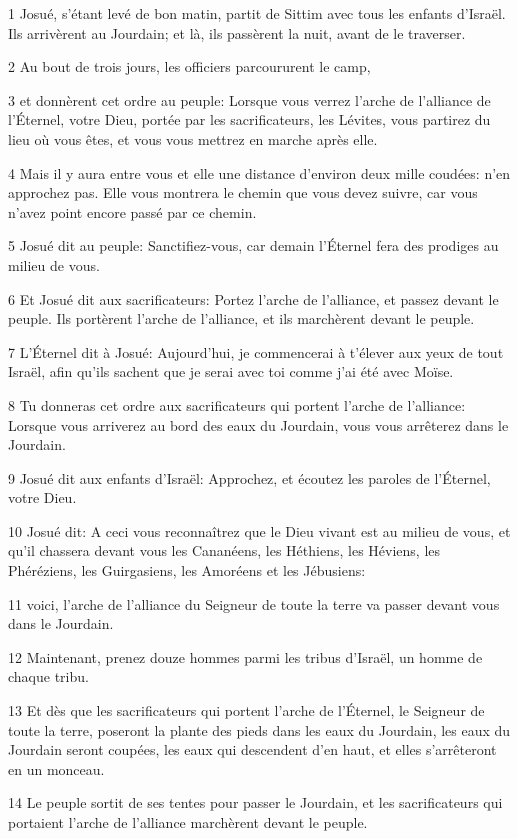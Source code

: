 \par 1 Josué, s'étant levé de bon matin, partit de Sittim avec tous les enfants d'Israël. Ils arrivèrent au Jourdain; et là, ils passèrent la nuit, avant de le traverser.
\par 2 Au bout de trois jours, les officiers parcoururent le camp,
\par 3 et donnèrent cet ordre au peuple: Lorsque vous verrez l'arche de l'alliance de l'Éternel, votre Dieu, portée par les sacrificateurs, les Lévites, vous partirez du lieu où vous êtes, et vous vous mettrez en marche après elle.
\par 4 Mais il y aura entre vous et elle une distance d'environ deux mille coudées: n'en approchez pas. Elle vous montrera le chemin que vous devez suivre, car vous n'avez point encore passé par ce chemin.
\par 5 Josué dit au peuple: Sanctifiez-vous, car demain l'Éternel fera des prodiges au milieu de vous.
\par 6 Et Josué dit aux sacrificateurs: Portez l'arche de l'alliance, et passez devant le peuple. Ils portèrent l'arche de l'alliance, et ils marchèrent devant le peuple.
\par 7 L'Éternel dit à Josué: Aujourd'hui, je commencerai à t'élever aux yeux de tout Israël, afin qu'ils sachent que je serai avec toi comme j'ai été avec Moïse.
\par 8 Tu donneras cet ordre aux sacrificateurs qui portent l'arche de l'alliance: Lorsque vous arriverez au bord des eaux du Jourdain, vous vous arrêterez dans le Jourdain.
\par 9 Josué dit aux enfants d'Israël: Approchez, et écoutez les paroles de l'Éternel, votre Dieu.
\par 10 Josué dit: A ceci vous reconnaîtrez que le Dieu vivant est au milieu de vous, et qu'il chassera devant vous les Cananéens, les Héthiens, les Héviens, les Phéréziens, les Guirgasiens, les Amoréens et les Jébusiens:
\par 11 voici, l'arche de l'alliance du Seigneur de toute la terre va passer devant vous dans le Jourdain.
\par 12 Maintenant, prenez douze hommes parmi les tribus d'Israël, un homme de chaque tribu.
\par 13 Et dès que les sacrificateurs qui portent l'arche de l'Éternel, le Seigneur de toute la terre, poseront la plante des pieds dans les eaux du Jourdain, les eaux du Jourdain seront coupées, les eaux qui descendent d'en haut, et elles s'arrêteront en un monceau.
\par 14 Le peuple sortit de ses tentes pour passer le Jourdain, et les sacrificateurs qui portaient l'arche de l'alliance marchèrent devant le peuple.
